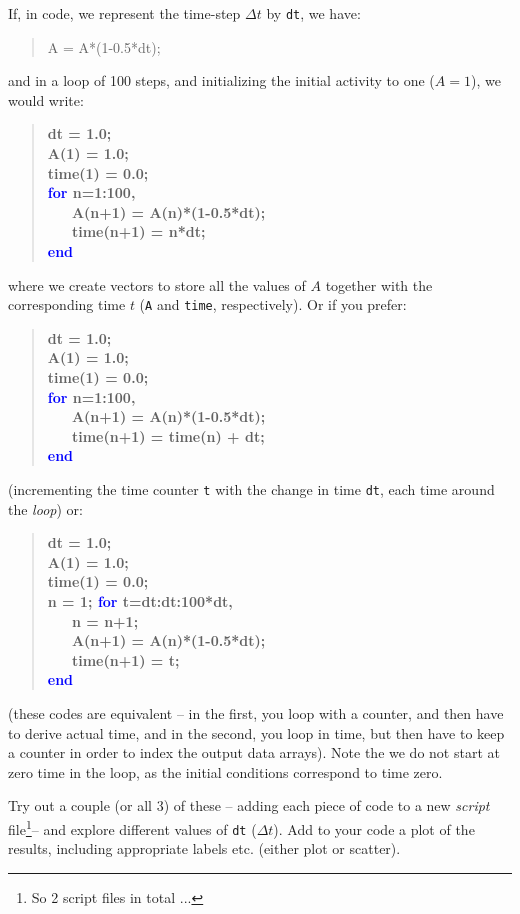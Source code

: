 \documentclass{tufte-book} %
\newenvironment{docspec}{\begin{quotation}\ttfamily\parskip0pt\parindent0pt\ignorespaces}{\end{quotation}}
\newenvironment{docspecbold}{\begin{quotation}\ttfamily\bfseries\parskip0pt\parindent0pt\ignorespaces}{\end{quotation}}
\begin{document}
If, in code, we represent the time-step \(\Delta t\) by \texttt{dt}, we have:
\begin{docspec}
A = A*(1-0.5*dt);
\end{docspec}
and in a loop of 100 steps, and initializing the initial activity to one (\(A=1\)), we would write:
\begin{docspecbold}
dt = 1.0;\\
A(1) = 1.0;\\
time(1) = 0.0;\\
\textcolor{blue}{for} n=1:100,\\
\ \ \ A(n+1) = A(n)*(1-0.5*dt);\\
\ \ \ time(n+1) = n*dt;\\
\textcolor{blue}{end}
\end{docspecbold}
where we create vectors to store all the values of \(A\) together with the corresponding time \(t\) (\texttt{A} and \texttt{time}, respectively). Or if you prefer:
\begin{docspecbold}
dt = 1.0;\\
A(1) = 1.0;\\
time(1) = 0.0;\\
\textcolor{blue}{for} n=1:100,\\
\ \ \ A(n+1) = A(n)*(1-0.5*dt);\\
\ \ \ time(n+1) = time(n) + dt;\\
\textcolor{blue}{end}
\end{docspecbold}
(incrementing the time counter \texttt{t} with the change in time \texttt{dt}, each time around the \textit{loop}) or:
\begin{docspecbold}
dt = 1.0;\\
A(1) = 1.0;\\
time(1) = 0.0;\\
n = 1;
\textcolor{blue}{for} t=dt:dt:100*dt,\\
\ \ \ n = n+1;\\
\ \ \ A(n+1) = A(n)*(1-0.5*dt);\\
\ \ \ time(n+1) = t;\\
\textcolor{blue}{end}
\end{docspecbold}
(these codes are equivalent -- in the first, you loop with a  counter, and then have to derive actual time, and in the second, you loop in time, but then have to keep a counter in order to index the output data arrays).
Note the we do not start at zero time in the loop, as the initial conditions correspond to time zero.

Try out a couple (or all 3) of these -- adding each piece of code to a new \textit{script} file\footnote{So 2 script files in total ...}-- and explore different values of \texttt{dt} (\(\Delta t\)).
Add to your code a plot of the results,  including appropriate labels etc. (either plot or scatter).
\end{document}
